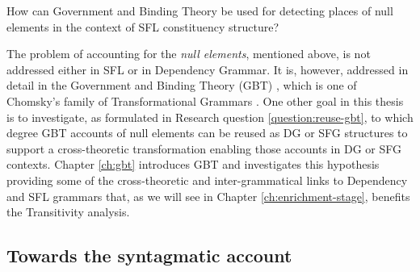 \begin{question}\label{question:reuse-gbt}
    How can Government and Binding Theory be used for detecting places of null elements in the context of SFL constituency structure?
\end{question}


The problem of accounting for the \textit{null elements}, mentioned above, is not addressed either in SFL or in Dependency Grammar. It is, however, addressed in detail in the Government and Binding Theory (GBT) \citep{Chomsky81,Haegeman1991}, which is one of Chomsky's family of Transformational Grammars \citep{Chomsky1957}. One other goal in this thesis is to investigate, as formulated in Research question \ref{question:reuse-gbt}, to which degree GBT accounts of null elements can be reused as DG or SFG structures to support a cross-theoretic transformation enabling those accounts in DG or SFG contexts. Chapter \ref{ch:gbt} introduces GBT and investigates this hypothesis providing some of the cross-theoretic and inter-grammatical links to Dependency and SFL grammars that, as we will see in Chapter \ref{ch:enrichment-stage}, benefits the Transitivity analysis.


\subsection{Towards the syntagmatic account}
\label{sec:syntagmatic-account}

